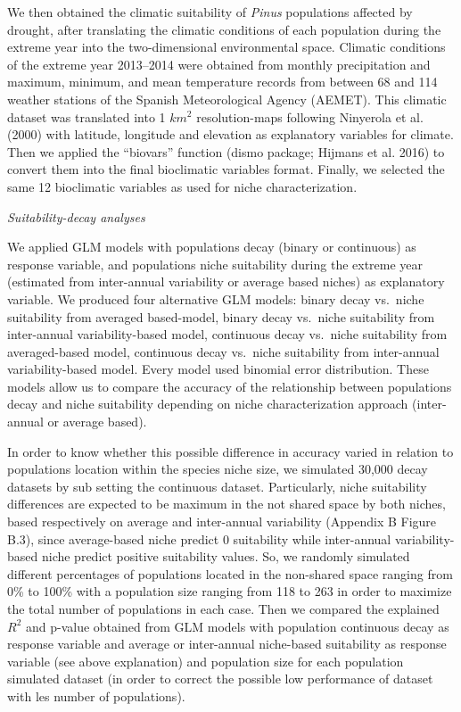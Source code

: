 \documentclass[11pt,twoside]{reedthesis}
\begin{document}
We then obtained the climatic suitability of \emph{Pinus} populations
affected by drought, after translating the climatic conditions of each
population during the extreme year into the two-dimensional
environmental space. Climatic conditions of the extreme year 2013--2014
were obtained from monthly precipitation and maximum, minimum, and mean
temperature records from between 68 and 114 weather stations of the
Spanish Meteorological Agency (AEMET). This climatic dataset was
translated into 1 \(km^2\) resolution-maps following Ninyerola et al.
(2000) with latitude, longitude and elevation as explanatory variables
for climate. Then we applied the ``biovars'' function (dismo package;
Hijmans et al. 2016) to convert them into the final bioclimatic
variables format. Finally, we selected the same 12 bioclimatic variables
as used for niche characterization.\par
\setlength{\parindent}{0pt} \emph{Suitability-decay analyses}\par  We
applied GLM models with populations decay (binary or continuous) as
response variable, and populations niche suitability during the extreme
year (estimated from inter-annual variability or average based niches)
as explanatory variable. We produced four alternative GLM models: binary
decay vs.~niche suitability from averaged based-model, binary decay
vs.~niche suitability from inter-annual variability-based model,
continuous decay vs.~niche suitability from averaged-based model,
continuous decay vs.~niche suitability from inter-annual
variability-based model. Every model used binomial error distribution.
These models allow us to compare the accuracy of the relationship
between populations decay and niche suitability depending on niche
characterization approach (inter-annual or average based).\par
\setlength{\parindent}{30pt} In order to know whether this possible
difference in accuracy varied in relation to populations location within
the species niche size, we simulated 30,000 decay datasets by sub
setting the continuous dataset. Particularly, niche suitability
differences are expected to be maximum in the not shared space by both
niches, based respectively on average and inter-annual variability
(Appendix B Figure B.3), since average-based niche predict 0 suitability
while inter-annual variability-based niche predict positive suitability
values. So, we randomly simulated different percentages of populations
located in the non-shared space ranging from 0\% to 100\% with a
population size ranging from 118 to 263 in order to maximize the total
number of populations in each case. Then we compared the explained
\(R^2\) and p-value obtained from GLM models with population continuous
decay as response variable and average or inter-annual niche-based
suitability as response variable (see above explanation) and population
size for each population simulated dataset (in order to correct the
possible low performance of dataset with les number of populations).\par
\end{document}
